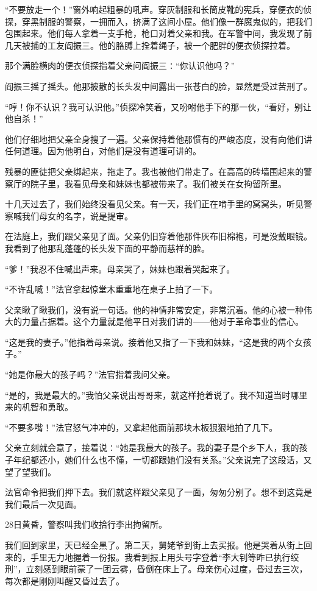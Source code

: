 \documentclass[12pt,UTF8]{ctexbook}
\begin{document}
“不要放走一个！”窗外响起粗暴的吼声。穿灰制服和长筒皮靴的宪兵，穿便衣的侦探，穿黑制服的警察，一拥而入，挤满了这间小屋。他们像一群魔鬼似的，把我们包围起来。他们每人拿着一支手枪，枪口对着父亲和我。在军警中间，我发现了前几天被捕的工友阎振三。他的胳膊上拴着绳子，被一个肥胖的便衣侦探拉着。

那个满脸横肉的便衣侦探指着父亲问阎振三∶“你认识他吗？”

阎振三摇了摇头。他那披散的长头发中间露出一张苍白的脸，显然是受过苦刑了。

“哼！你不认识？我可认识他。”侦探冷笑着，又吩咐他手下的那一伙，“看好，别让他自杀！”

他们仔细地把父亲全身搜了一遍。父亲保持着他那惯有的严峻态度，没有向他们讲任何道理。因为他明白，对他们是没有道理可讲的。

残暴的匪徒把父亲绑起来，拖走了。我也被他们带走了。在高高的砖墙围起来的警察厅的院子里，我看见母亲和妹妹也都被带来了。我们被关在女拘留所里。

十几天过去了，我们始终没看见父亲。有一天，我们正在啃手里的窝窝头，听见警察喊我们母女的名字，说是提审。

在法庭上，我们跟父亲见了面。父亲仍旧穿着他那件灰布旧棉袍，可是没戴眼镜。我看到了他那乱蓬蓬的长头发下面的平静而慈祥的脸。

“爹！”我忍不住喊出声来。母亲哭了，妹妹也跟着哭起来了。

“不许乱喊！”法官拿起惊堂木重重地在桌子上拍了一下。

父亲瞅了瞅我们，没有说一句话。他的神情非常安定，非常沉着。他的心被一种伟大的力量占据着。这个力量就是他平日对我们讲的——他对于革命事业的信心。

“这是我的妻子。”他指着母亲说。接着他又指了一下我和妹妹，“这是我的两个女孩子。”

“她是你最大的孩子吗？”法官指着我问父亲。

“是的，我是最大的。”我怕父亲说出哥哥来，就这样抢着说了。我不知道当时哪里来的机智和勇敢。

“不要多嘴！”法官怒气冲冲的，又拿起他面前那块木板狠狠地拍了几下。

父亲立刻就会意了，接着说∶“她是我最大的孩子。我的妻子是个乡下人，我的孩子年纪都还小，她们什么也不懂，一切都跟她们没有关系。”父亲说完了这段话，又望了望我们。

法官命令把我们押下去。我们就这样跟父亲见了一面，匆匆分别了。想不到这竟是我们最后一次见面。

28日黄昏，警察叫我们收拾行李出拘留所。

我们回到家里，天已经全黑了。第二天，舅姥爷到街上去买报。他是哭着从街上回来的，手里无力地握着一份报。我看到报上用头号字登着“李大钊等昨已执行绞刑”，立刻感到眼前蒙了一团云雾，昏倒在床上了。母亲伤心过度，昏过去三次，每次都是刚刚叫醒又昏过去了。
\end{document}

